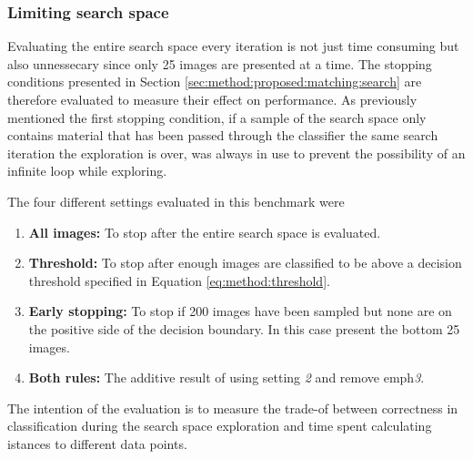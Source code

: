 \subsubsection{Limiting search space}
\label{sec:method:eval:param:stopping}

Evaluating the entire search space every iteration is not just time consuming but also unnessecary since only 25 images are presented at a time. The stopping conditions presented in Section \ref{sec:method:proposed:matching:search} are therefore evaluated to measure their effect on performance.
As previously mentioned the first stopping condition, if a sample of the search space only contains material that has been passed through the classifier the same search iteration the exploration is over,  was always in use to prevent the possibility of an infinite loop while exploring. 

The four different settings evaluated in this benchmark were
\begin{enumerate}
	\item \textbf{All images:} To stop after the entire search space is evaluated. 
	\item \textbf{Threshold:} To stop after enough images are classified to be above a decision threshold specified in Equation \ref{eq:method:threshold}. 
	\item \textbf{Early stopping:} To stop if 200 images have been sampled but none are on the positive side of the decision boundary. In this case present the bottom 25 images. 
	\item \textbf{Both rules:} The additive result of using setting  \emph{2} and remove emph\emph{3}.
\end{enumerate} 
\medskip

The intention of the evaluation is to measure the trade-of between correctness in classification during the search space exploration and time spent calculating istances to different data points.
